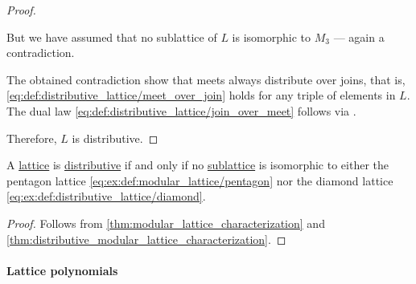 \begin{proof}
\begin{itemize}
    But we have assumed that no sublattice of \( L \) is isomorphic to \( M_3 \) --- again a contradiction.
  \end{itemize}

  The obtained contradiction show that meets always distribute over joins, that is, \eqref{eq:def:distributive_lattice/meet_over_join} holds for any triple of elements in \( L \). The dual law \eqref{eq:def:distributive_lattice/join_over_meet} follows via .

  Therefore, \( L \) is distributive.
\end{proof}

\begin{corollary}\label{thm:distributive_lattice_characterization}
  A \hyperref[def:lattice]{lattice} is \hyperref[def:modular_lattice]{distributive} if and only if no \hyperref[def:lattice/subobject]{sublattice} is isomorphic to either the pentagon lattice \eqref{eq:ex:def:modular_lattice/pentagon} nor the diamond lattice \eqref{eq:ex:def:distributive_lattice/diamond}.
\end{corollary}
\begin{proof}
  Follows from \cref{thm:modular_lattice_characterization} and \cref{thm:distributive_modular_lattice_characterization}.
\end{proof}

\paragraph{Lattice polynomials}

